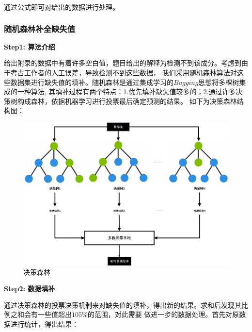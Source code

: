 \documentclass[UTF8]{ctexart}
\begin{document}
通过公式即可对给出的数据进行处理。
\subsubsection{随机森林补全缺失值}
\textbf{Step1: 算法介绍}

给出附录的数据中有着许多空白值，题目给出的解释为检测不到该成分。考虑到由于考古工作者的人工误差，导致检测不到这些数据，
我们采用随机森林算法对这些数据集进行缺失值的填补。随机森林是通过集成学习的$Bagging$思想将多棵树集成的一种算法,
其填补过程有两个特点：1.优先填补缺失值较多的；2.通过许多决策树构成森林，依据机器学习进行投票最后确定预测的结果。
如下为决策森林结构图：
\begin{figure}[H]\centering
	\includegraphics[width=1\textwidth]{img/rf.png} %
	\caption{决策森林} %
	\label{fig:figure 1} %
\end{figure}




\textbf{Step2: 数据填补}

通过决策森林的投票决策机制来对缺失值的填补，得出新的结果。求和后发现其比例之和会有一些值超出$105 \% $的范围，对此需要
做进一步的数据处理。首先对原数据进行统计，得出结果：
\end{document}
